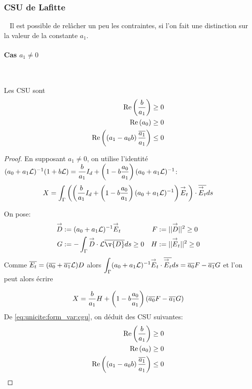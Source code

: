    \subsubsection{CSU de Lafitte}
      ~
      Il est possible de relâcher un peu les contraintes, si l'on fait une distinction sur la valeur de la constante \(a_1\).
      \paragraph{Cas \(a_1\not=0\)}
        ~
        \begin{prop}
          Les CSU sont
          \begin{align}
            \operatorname{Re}\left(\dfrac{b}{a_1}\right) \ge 0 \\
            \operatorname{Re}\left(a_0\right) \ge 0 \\
            \operatorname{Re}\left(\left(a_1-a_0 b\right)\dfrac{{\overline{a_1}}}{a_1}\right) \le 0
          \end{align}
        \end{prop}
        \begin{proof}
          En supposant \(a_1 \not=0\), on utilise l'identité \((a_0 + a_1 \mathcal{L})^{-1}(1 + b \mathcal{L})  = \dfrac{b}{a_1} I_d + \left(1-b\dfrac{a_0}{a_1}\right)(a_0+a_1 \mathcal{L})^{-1}\):
          \[
            X = \int_\Gamma \left(\left(\dfrac{b}{a_1} I_d + \left(1-b\dfrac{a_0}{a_1}\right)(a_0+a_1 \mathcal{L})^{-1}\right){\overset{\rightarrow}{E}}_t\right) \cdot {\overline{{\overset{\rightarrow}{E}}_t}} ds
          \]

          On pose:
          \begin{align*}
            \vect D &:= (a_0 + a_1 \LL)^{-1}\vE_t & F&:= || \vect D || ^2 \ge 0  \\
            G&:= -\int_\Gamma \vect D \cdot \LL\conj{\v{D}} ds \ge 0 & H &:= || \vE_t || ^2 \ge 0
          \end{align*}
          Comme \({\overline{E_t}} = ({\overline{a_0}} + {\overline{a_1}}\mathcal{L})D\) alors \(\displaystyle\int_\Gamma (a_0 +a_1 \mathcal{L}) ^{-1}{\overset{\rightarrow}{E}}_t\cdot {\overline{{\overset{\rightarrow}{E}}_t}} ds = {\overline{a_0}} F - {\overline{a_1}} G\) et l'on peut alors écrire

          \begin{equation}
            \label{eq:unicite:form_var:decomp_cgu_ci1_a1}
            X = \dfrac{b}{a_1}H   + \left(1-b\dfrac{a_0}{a_1}\right)\left({\overline{a_0}} F - {\overline{a_1}} G\right)
          \end{equation}
          De \eqref{eq:unicite:form_var:cgu}, on déduit des CSU suivantes:
          \begin{align}
            \operatorname{Re}\left(\dfrac{b}{a_1}\right) \ge 0 \\
            \operatorname{Re}\left(a_0\right) \ge 0 \\
            \operatorname{Re}\left(\left(a_1-a_0 b\right)\dfrac{{\overline{a_1}}}{a_1}\right) \le 0
          \end{align}
        \end{proof}

